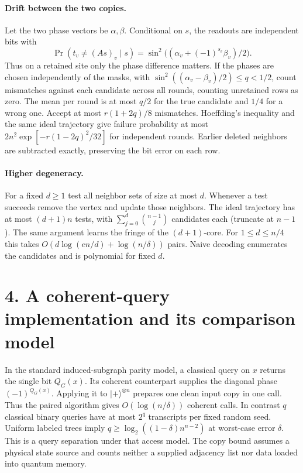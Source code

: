 \documentclass[11pt]{article}
\newcommand{\ket}[1]{\lvert #1\rangle}
\begin{document}
\paragraph{Drift between the two copies.}
Let the two phase vectors be $\alpha,\beta$. Conditional on $s$, the
readouts are independent bits with
\[
 \Pr(t_v\ne(As)_v\mid s)
    =\sin^2\!\big((\alpha_v+(-1)^{s_v}\beta_v)/2\big).
\]
Thus on a retained site only the phase difference matters. If the phases
are chosen independently of the masks, with
$\sin^2((\alpha_v-\beta_v)/2)\le q<1/2$, count mismatches against each
candidate across all rounds, counting unretained rows as zero.
The mean per round is at most $q/2$ for the true candidate and $1/4$
for a wrong one. Accept at most $r(1+2q)/8$ mismatches. Hoeffding's
inequality and the same ideal trajectory give failure probability at most
$2n^2\exp[-r(1-2q)^2/32]$ for independent rounds. Earlier deleted
neighbors are subtracted exactly, preserving the bit error on each row.

\paragraph{Higher degeneracy.}
For a fixed $d\ge1$ test all neighbor sets of size at most $d$. Whenever a
test succeeds remove the vertex and update those neighbors. The ideal
trajectory has at most $(d+1)n$ tests, with
$\sum_{j=0}^d\binom{n-1}{j}$ candidates each (truncate at $n-1$).
The same argument learns the fringe of the $(d+1)$-core. For
$1\le d\le n/4$ this takes $O(d\log(en/d)+\log(n/\delta))$ pairs.
Naive decoding enumerates the candidates and is polynomial for fixed $d$.

\newpage
\section*{4. A coherent-query implementation and its comparison model}
In the standard induced-subgraph parity model, a classical query on $x$
returns the single bit $Q_G(x)$. Its coherent counterpart supplies the
diagonal phase $(-1)^{Q_G(x)}$. Applying it to $\ket{+}^{\otimes n}$
prepares one clean input copy in one call. Thus the paired algorithm gives
$O(\log(n/\delta))$ coherent calls. In contrast $q$ classical binary
queries have at most $2^q$ transcripts per fixed random seed. Uniform
labeled trees imply $q\ge\log_2((1-\delta)n^{n-2})$ at worst-case error
$\delta$. This is a query separation under that access model. The copy
bound assumes a physical state source and counts neither a supplied
adjacency list nor data loaded into quantum memory.
\end{document}
